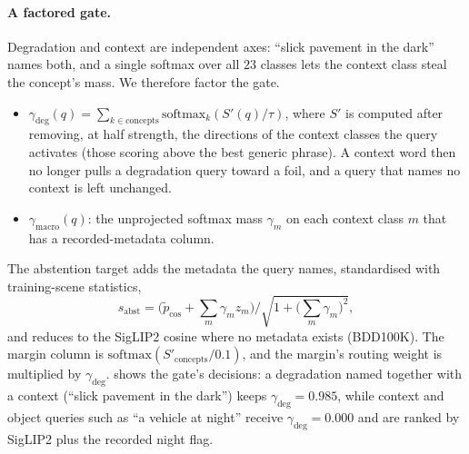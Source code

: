 \documentclass[10pt,twocolumn,letterpaper]{article}
\newcommand{\gdeg}{\gamma_{\mathrm{deg}}}
\newcommand{\gmac}{\gamma_{\mathrm{macro}}}
\begin{document}
\paragraph{A factored gate.} Degradation and context are independent axes:
``slick pavement in the dark'' names both, and a single softmax over all $23$
classes lets the context class steal the concept's mass. We therefore factor the
gate.
\begin{itemize}\setlength{\itemsep}{0pt}
\item $\gdeg(q)=\sum_{k\in\text{concepts}}\mathrm{softmax}_k(S'(q)/\tau)$, where
  $S'$ is computed after removing, at half strength, the directions of the context
  classes the query activates (those scoring above the best generic phrase). A
  context word then no longer pulls a degradation query toward a foil, and a query
  that names no context is left unchanged.
\item $\gmac(q)$: the unprojected softmax mass $\gamma_m$ on each context class
  $m$ that has a recorded-metadata column.
\end{itemize}
The abstention target adds the metadata the query names, standardised with
training-scene statistics,
\begin{equation}
s_{\mathrm{abst}}=\Big(\tilde p_{\cos}+\textstyle\sum_m\gamma_m z_m\Big)\Big/\sqrt{1+\big(\textstyle\sum_m\gamma_m\big)^2},
\label{eq:abst}
\end{equation}
and reduces to the SigLIP2 cosine where no metadata exists (BDD100K). The margin
column is $\mathrm{softmax}(S'_{\text{concepts}}/0.1)$, and the margin's routing
weight is multiplied by $\gdeg$.  shows the gate's decisions: a
degradation named together with a context (``slick pavement in the dark'') keeps
$\gdeg=0.985$, while context and object queries such as ``a vehicle at night''
receive $\gdeg=0.000$ and are ranked by SigLIP2 plus the recorded night flag.

\begin{table}[t]\centering\small
\caption{\textbf{Concept-gate decisions} for example queries: the human-labelled
glare query, suite and BDD100K queries, two queries of \cref{fig:qual} and the
supplementary, and two illustrative queries. Context: context classes the query
activates. Ranked by: the dominant term of
\cref{eq:score} (head with its selected VLM margin, or the abstention target).
``Snow covering the road'', which no training phrasing describes, is the remaining
false trigger.}
\label{tab:gate}
\resizebox{\columnwidth}{!}{}
\end{table}
\end{document}
